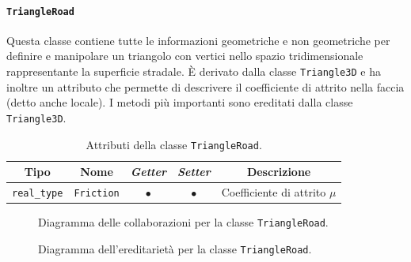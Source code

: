 \paragraph{\texttt{TriangleRoad}}
Questa classe contiene tutte le informazioni geometriche e non geometriche per definire e manipolare un triangolo con vertici nello spazio tridimensionale rappresentante la superficie stradale. È derivato dalla classe \texttt{Triangle3D} e ha inoltre un attributo che permette di descrivere il coefficiente di attrito nella faccia (detto anche locale). I metodi più importanti sono ereditati dalla classe \texttt{Triangle3D}.
\begin{table}[h!]
	\centering
	\begin{tabular}{|c|c|c|c|c|}
		\hline 
		\textbf{Tipo} & \textbf{Nome} & \textit{\textbf{Getter}} & \textit{\textbf{Setter}} & \textbf{Descrizione} \\ \hline 
		\texttt{real\_type} & \texttt{Friction} & $\bullet$ & $\bullet$ & Coefficiente di attrito $\mu$ \\ \hline
	\end{tabular}
	\caption{Attributi della classe \texttt{TriangleRoad}.}
\end{table}
%
\begin{figure}
	\centering
	\caption{Diagramma delle collaborazioni per la classe \texttt{TriangleRoad}.}
\end{figure}
%
\begin{figure}
	\centering
	\caption{Diagramma dell'ereditarietà per la classe \texttt{TriangleRoad}.}
\end{figure}
%
